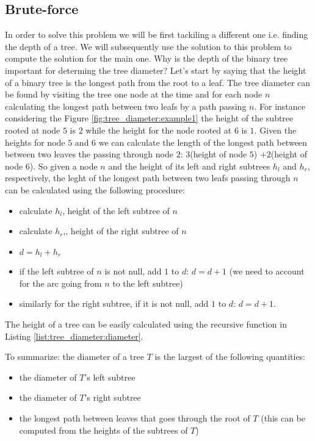 \subsection{Brute-force}
\label{tree_diameter:sec:bruteforce}

In order to  solve this problem we will be first tackiling a different one i.e. finding the depth of a tree. We will subsequently use the solution to this problem to compute the solution for the main one. 
Why is the depth of the binary tree important for determing the tree diameter? Let's start by saying that the height of a binary tree is the longest path from the root to a leaf. The tree diameter can be found by visiting the tree one node at the time and for each node $n$ calculating the longest path between two leafs by a path passing $n$. For instance considering the Figure \ref{fig:tree_diameter:example1} the height of the subtree rooted at node $5$ is $2$ while the height for the node rooted at $6$ is $1$. Given the heights for node $5$ and $6$ we can calculate the length of the longest path between between two  leaves the passing through node $2$: $3$(height of node $5$) $+2$(height of node $6$). So given a node $n$ and the height of its left and right subtrees $h_l$ and $h_r$, respectively, the leght of the longest path between two leafs passing through $n$ can be calculated using the following procedure:

\begin{itemize}
	\item calculate $h_l$, height of the left subtree  of $n$
	\item calculate $h_r$,, height of the right subtree  of $n$
	\item $d=h_l+h_r$
	\item if the left subtree of $n$ is not null, add $1$ to $d$: $d=d+1$ (we need to account for the arc going from $n$ to the left subtree)
	\item similarly for the right subtree, if it is not null, add $1$ to $d$: $d=d+1$.
\end{itemize}

The height of a tree can be easily calculated using the recursive function  in Listing \ref{list:tree_diameter:diameter}.

To summarize:  the diameter of a tree $T$ is the largest of the following quantities:
\begin{itemize}
    \item the diameter of $T$'s left subtree
    \item the diameter of $T$'s right subtree
    \item the longest path between leaves that goes through the root of $T$ (this can be computed from the heights of the subtrees of $T$) 
\end{itemize}

